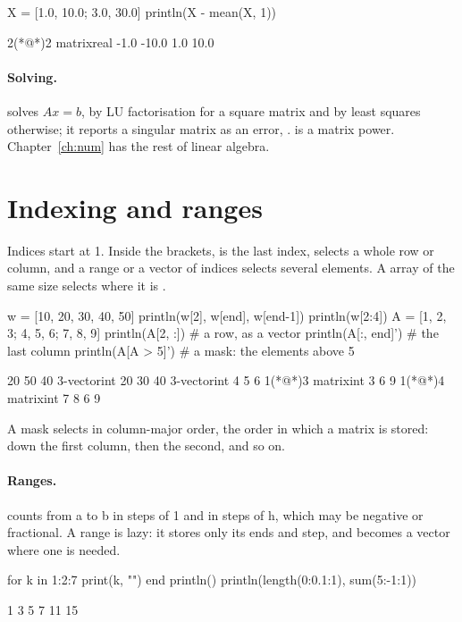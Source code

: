 \documentclass[11pt,a4paper,openany]{report}
\begin{document}
{{\begin{axon}
X = [1.0, 10.0; 3.0, 30.0]
println(X - mean(X, 1))
\end{axon}
\begin{axonout}
2(*@\texttimes@*)2 matrix{real}
  -1.0  -10.0
   1.0   10.0
\end{axonout}

\paragraph{Solving.}  solves $Ax=b$, by LU factorisation for a
square matrix and by least squares otherwise; it reports a singular matrix
as an error, .  is a matrix power. Chapter~\ref{ch:num}
has the rest of linear algebra.

\section{Indexing and ranges}

Indices start at 1. Inside the brackets,  is the last index, \code{:}
selects a whole row or column, and a range or a vector of indices selects
several elements. A  array of the same size selects where it is
.

\begin{axon}
w = [10, 20, 30, 40, 50]
println(w[2], w[end], w[end-1])
println(w[2:4])
A = [1, 2, 3; 4, 5, 6; 7, 8, 9]
println(A[2, :])        # a row, as a vector
println(A[:, end]')     # the last column
println(A[A > 5]')      # a mask: the elements above 5
\end{axon}
\begin{axonout}
20 50 40
3-vector{int}
  20
  30
  40
3-vector{int}
  4
  5
  6
1(*@\texttimes@*)3 matrix{int}
  3  6  9
1(*@\texttimes@*)4 matrix{int}
  7  8  6  9
\end{axonout}

A mask selects in column-major order, the order in which a matrix is stored:
down the first column, then the second, and so on.

\paragraph{Ranges.}  counts from a to b in steps of 1 and
 in steps of h, which may be negative or fractional. A range is lazy:
it stores only its ends and step, and becomes a vector where one is needed.

\begin{axon}
for k in 1:2:7
  print(k, "")
end
println()
println(length(0:0.1:1), sum(5:-1:1))
\end{axon}
\begin{axonout}
1 3 5 7
11 15
\end{axonout}

}}
\end{document}
